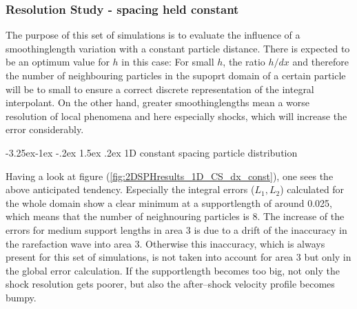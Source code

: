 \documentclass{report}
\makeatletter
\renewcommand\paragraph{\@startsection{paragraph}{4}{\z@}%
  {-3.25ex\@plus -1ex \@minus -.2ex}%
  {1.5ex \@plus .2ex}%
  {\normalfont\normalsize\bfseries}}
\makeatother
\begin{document}
\begin{figure}[H]
\centering
\label{fig:2DSPHresults_tempRes_vProfile}

\end{figure}



\subsubsection{Resolution Study - spacing held constant}
\label{sec:2DSPH_results_shock_resSTudy_dx=const}
The purpose of this set of simulations is to evaluate the influence of a smoothinglength variation with a constant particle distance. There is expected to be an optimum value for $h$ in this case: For small $h$, the ratio $h/dx$ and therefore the number of neighbouring particles in the supoprt domain of a certain particle will be to small to ensure a correct discrete representation of the integral interpolant. On the other hand, greater smoothinglengths mean a worse resolution of local phenomena and here especially shocks, which will increase the error considerably. 


\paragraph{1D constant spacing particle distribution}

Having a look at figure (\ref{fig:2DSPHresults_1D_CS_dx_const}), one sees the above anticipated tendency. Especially the integral errors ($L_1,L_2$) calculated for the whole domain show a clear minimum at a supportlength of around 0.025, which means that the number of neighnouring particles is 8. 
The increase of the errors for medium support lengths in area 3 is due to a drift of the inaccuracy in the rarefaction wave into area 3. Otherwise this inaccuracy, which is always present for this set of simulations, is not taken into account for area 3 but only in the global error calculation. 
If the supportlength becomes too big, not only the shock resolution gets poorer, but also the after--shock velocity profile becomes bumpy.
\end{document}

